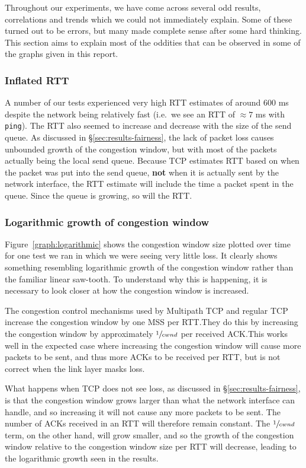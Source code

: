 Throughout our experiments, we have come across several odd results,
correlations and trends which we could not immediately explain. Some of these
turned out to be errors, but many made complete sense after some hard thinking.
This section aims to explain most of the oddities that can be observed in some
of the graphs given in this report.

\subsubsection{Inflated RTT}
A number of our tests experienced very high RTT estimates of around 600 ms
despite the network being relatively fast (i.e.\ we see an RTT of $\approx 7$ ms
with \texttt{ping}). The RTT also seemed to increase and decrease with the size
of the send queue. As discussed in \S\ref{sec:results-fairness}, the lack of
packet loss causes unbounded growth of the congestion window, but with most of
the packets actually being the local send queue. Because TCP estimates RTT based
on when the packet was put into the send queue, \textbf{not} when it is actually
sent by the network interface, the RTT estimate will include the time a packet
spent in the queue. Since the queue is growing, so will the RTT.

\subsubsection{Logarithmic growth of congestion window}
Figure~\ref{graph:logarithmic} shows the congestion window size plotted over
time for one test we ran in which we were seeing very little loss. It clearly
shows something resembling logarithmic growth of the congestion window rather
than the familiar linear saw-tooth. To understand why this is happening, it is
necessary to look closer at how the congestion window is increased.

The congestion control mechanisms used by Multipath TCP and regular TCP increase
the congestion window by one MSS per RTT.\@ They do this by increasing the
congestion window by approximately $\sfrac{1}{cwnd}$ per received ACK.\@ This
works well in the expected case where increasing the congestion window will
cause more packets to be sent, and thus more ACKs to be received per RTT, but is
not correct when the link layer masks loss.

What happens when TCP does not see loss, as discussed in
\S\ref{sec:results-fairness}, is that the congestion window grows larger than
what the network interface can handle, and so increasing it will not cause any
more packets to be sent. The number of ACKs received in an RTT will therefore
remain constant. The $\sfrac{1}{cwnd}$ term, on the other hand, will grow
smaller, and so the growth of the congestion window relative to the congestion
window size per RTT will decrease, leading to the logarithmic growth seen in the
results.

